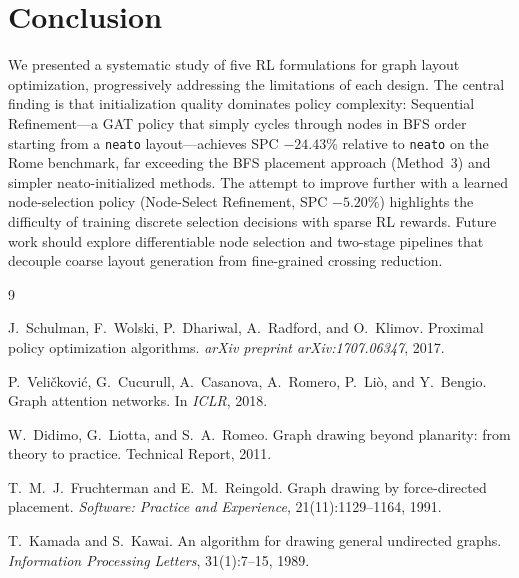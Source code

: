 \documentclass[10pt,twocolumn]{article}
\begin{document}
\section{Conclusion}
\label{sec:conclusion}

We presented a systematic study of five RL formulations for graph layout
optimization, progressively addressing the limitations of each design.
The central finding is that initialization quality dominates policy
complexity: Sequential Refinement---a GAT policy that simply cycles through
nodes in BFS order starting from a \texttt{neato} layout---achieves SPC
$-24.43\%$ relative to \texttt{neato} on the Rome benchmark, far exceeding
the BFS placement approach (Method~3) and simpler neato-initialized methods.  The attempt to improve further with a learned
node-selection policy (Node-Select Refinement, SPC $-5.20\%$) highlights
the difficulty of training discrete selection decisions with sparse
RL rewards.  Future work should explore differentiable node selection and
two-stage pipelines that decouple coarse layout generation from fine-grained
crossing reduction.


\begin{thebibliography}{9}

J.~Schulman, F.~Wolski, P.~Dhariwal, A.~Radford, and O.~Klimov.
\newblock Proximal policy optimization algorithms.
\newblock \textit{arXiv preprint arXiv:1707.06347}, 2017.

P.~Veli{\v{c}}kovi{\'c}, G.~Cucurull, A.~Casanova, A.~Romero, P.~Li{\`o},
and Y.~Bengio.
\newblock Graph attention networks.
\newblock In \textit{ICLR}, 2018.

W.~Didimo, G.~Liotta, and S.~A.~Romeo.
\newblock Graph drawing beyond planarity: from theory to practice.
\newblock Technical Report, 2011.

T.~M.~J.~Fruchterman and E.~M.~Reingold.
\newblock Graph drawing by force-directed placement.
\newblock \textit{Software: Practice and Experience}, 21(11):1129--1164, 1991.

T.~Kamada and S.~Kawai.
\newblock An algorithm for drawing general undirected graphs.
\newblock \textit{Information Processing Letters}, 31(1):7--15, 1989.

\end{thebibliography}
\end{document}
